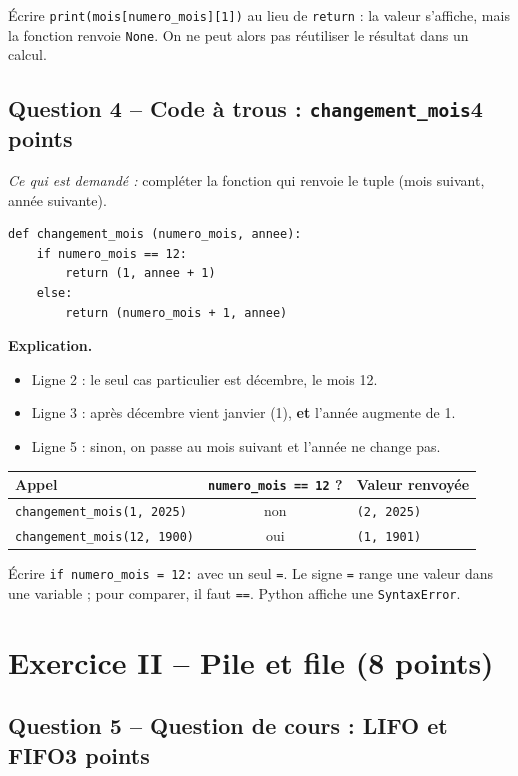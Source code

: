 \documentclass[11pt, a4paper]{exam}
\newcommand{\code}[1]{\texttt{#1}}
\newcommand{\Qt}[2]{\subsection*{#1\hfill{\normalfont\small #2}}}
\newcommand{\rappel}[1]{\noindent\textit{Ce qui est demandé :} #1\par\smallskip}
\newcommand{\explication}{\noindent\textbf{Explication.}\ }
\begin{document}
\begin{erreur}
Écrire \code{print(mois[numero\_mois][1])} au lieu de \code{return} : la valeur s'affiche, mais la fonction renvoie \code{None}. On ne peut alors pas réutiliser le résultat dans un calcul.
\end{erreur}

\Qt{Question 4 -- Code à trous : \code{changement\_mois}}{4 points}
\rappel{compléter la fonction qui renvoie le tuple (mois suivant, année suivante).}
\begin{reponse}
\begin{lstlisting}
def changement_mois (numero_mois, annee):
    if numero_mois == 12:
        return (1, annee + 1)
    else:
        return (numero_mois + 1, annee)
\end{lstlisting}
\end{reponse}
\explication
\begin{itemize}
\item Ligne 2 : le seul cas particulier est décembre, le mois 12.
\item Ligne 3 : après décembre vient janvier (1), \textbf{et} l'année augmente de 1.
\item Ligne 5 : sinon, on passe au mois suivant et l'année ne change pas.
\end{itemize}
\begin{center}\small
\begin{tabular}{|l|c|l|}\hline
Appel & \code{numero\_mois == 12} ? & Valeur renvoyée \\\hline
\code{changement\_mois(1, 2025)} & non & \code{(2, 2025)} \\\hline
\code{changement\_mois(12, 1900)} & oui & \code{(1, 1901)} \\\hline
\end{tabular}
\end{center}

\begin{erreur}
Écrire \code{if numero\_mois = 12:} avec un seul \code{=}. Le signe \code{=} range une valeur dans une variable ; pour comparer, il faut \code{==}. Python affiche une \code{SyntaxError}.
\end{erreur}

\section*{Exercice II -- Pile et file (8 points)}

\Qt{Question 5 -- Question de cours : LIFO et FIFO}{3 points}
\end{document}
